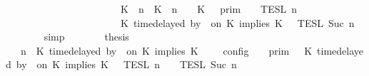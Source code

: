 \begin{isabellebody}
\ \ \ \ \ \ \ \ \ \ \ \ \ \ \ \ \ \ \ \ \ {\isacharequal}\ {\isasymlbrakk}{\isasymlbrakk}\ {\isacharparenleft}K\ {\isasymUp}\ n{\isacharparenright}\ {\isacharhash}\ {\isacharparenleft}K\ {\isacharat}\ n\ {\isasymoplus}\ {\isasymdelta}{\isasymtau}\ {\isasymRightarrow}\ K\ {\isacharhash}\ {\isasymGamma}\ {\isasymrbrakk}{\isasymrbrakk}\isactrlsub p\isactrlsub r\isactrlsub i\isactrlsub m\ {\isasyminter}\ {\isasymlbrakk}{\isasymlbrakk}\ {\isasymPsi}\ {\isasymrbrakk}{\isasymrbrakk}\isactrlsub T\isactrlsub E\isactrlsub S\isactrlsub L\isactrlbsup {\isasymge}\ n\isactrlesup \isanewline
\ \ \ \ \ \ \ \ \ \ \ \ \ \ \ \ \ \ \ \ \ {\isasyminter}\ {\isasymlbrakk}{\isasymlbrakk}\ {\isacharparenleft}K\ time{\isacharminus}delayed\ by\ {\isasymdelta}{\isasymtau}\ on\ K\ implies\ K\ {\isacharhash}\ {\isasymPhi}\ {\isasymrbrakk}{\isasymrbrakk}\isactrlsub T\isactrlsub E\isactrlsub S\isactrlsub L\isactrlbsup {\isasymge}\ Suc\ n\isactrlesup {\isacartoucheclose}\isanewline
\ \ \ \ \ \ \isamarkupfalse%
\ simp\isanewline
\ \ \ \ \isamarkupfalse%
\ \isamarkupfalse%
\ {\isacharquery}thesis\isanewline
\ \ \ \ \isamarkupfalse%
\ {\isacharminus}\isanewline
\ \ \ \ \ \ \isamarkupfalse%
\ {\isacartoucheopen}{\isasymlbrakk}\ {\isasymGamma}{\isacharcomma}\ n\ {\isasymturnstile}\ {\isacharparenleft}K\ time{\isacharminus}delayed\ by\ {\isasymdelta}{\isasymtau}\ on\ K\ implies\ K\ {\isacharhash}\ {\isasymPsi}\ {\isasymtriangleright}\ {\isasymPhi}\ {\isasymrbrakk}\isactrlsub c\isactrlsub o\isactrlsub n\isactrlsub f\isactrlsub i\isactrlsub g\ {\isacharequal}\ {\isasymlbrakk}{\isasymlbrakk}\ {\isasymGamma}\ {\isasymrbrakk}{\isasymrbrakk}\isactrlsub p\isactrlsub r\isactrlsub i\isactrlsub m\ {\isasyminter}\ {\isacharparenleft}{\isasymlbrakk}{\isasymlbrakk}\ {\isacharparenleft}K\ time{\isacharminus}delayed\ by\ {\isasymdelta}{\isasymtau}\ on\ K\ implies\ K\ {\isacharhash}\ {\isasymPsi}\ {\isasymrbrakk}{\isasymrbrakk}\isactrlsub T\isactrlsub E\isactrlsub S\isactrlsub L\isactrlbsup {\isasymge}\ n\isactrlesup \ {\isasyminter}\ {\isasymlbrakk}{\isasymlbrakk}\ {\isasymPhi}\ {\isasymrbrakk}{\isasymrbrakk}\isactrlsub T\isactrlsub E\isactrlsub S\isactrlsub L\isactrlbsup {\isasymge}\ Suc\ n\isactrlesup {\isacharparenright}{\isacartoucheclose}\isanewline

\end{isabellebody}
